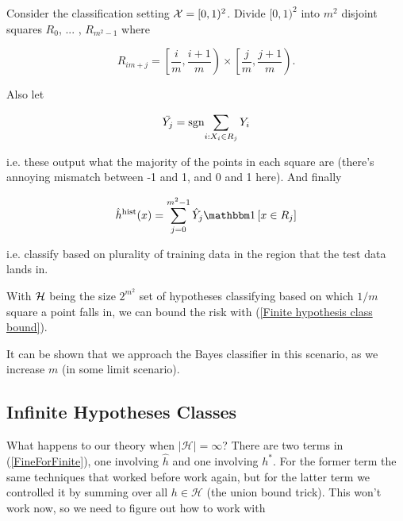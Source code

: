 \documentclass[11pt]{scrartcl}
\begin{document}
\begin{example}
\label{the histogram classifier}
Consider the classification setting $\mathcal{X} = [0,1)^2$. Divide $[0,1)^2$ into $m^2$ disjoint squares $R_0$, ... , $R_{m^2-1}$ where

\begin{equation}
    R_{im + j} = \left[ \frac{i}{m}, \frac{i+1}{m} \right) \times \left[ \frac{j}{m}, \frac{j+1}{m} \right).
\end{equation}

Also let 

\begin{equation}
    \bar{Y_j} = \text{sgn}{\sum_{i: X_i \in R_j} Y_i}
\end{equation}

i.e. these output what the majority of the points in each square are (there's annoying mismatch between -1 and 1, and 0 and 1 here). And finally

\begin{equation}
    \hat{h}^\text{hist}(x) = \sum_{j=0}^{m^2-1} \hat{Y}_j \one{x \in R_j}
\end{equation}

i.e. classify based on plurality of training data in the region that the test data lands in.


With $\mathcal{H}$ being the size $2^{m^2}$ set of hypotheses classifying based on which $1/m$ square a point falls in, we can bound the risk with (\ref{Finite hypothesis class bound}).

It can be shown that we approach the Bayes classifier in this scenario, as we increase $m$ (in some limit scenario).
\end{example}

\subsection{Infinite Hypotheses Classes}

What happens to our theory when $|\mathcal{H}| = \infty$? There are two terms in (\ref{FineForFinite}), one involving $\hat{h}$ and one involving $h^*$. For the former term the same techniques that worked before work again, but for the latter term we controlled it by summing over all $h \in \mathcal{H}$ (the union bound trick). This won't work now, so we need to figure out how to work with 
\end{document}
